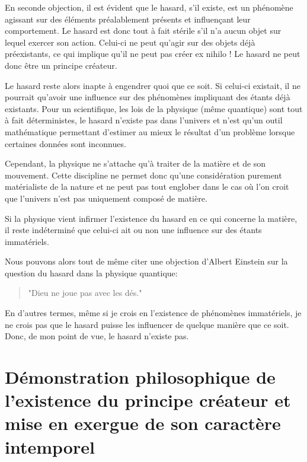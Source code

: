 En seconde objection, il est évident que le hasard, s’il existe, est un phénomène agissant sur des éléments préalablement présents et influençant leur comportement. Le hasard est donc tout à fait stérile s’il n’a aucun objet sur lequel exercer son action. Celui-ci ne peut qu’agir sur des objets déjà préexistants, ce qui implique qu’il ne peut pas créer ex nihilo ! Le hasard ne peut donc être un principe créateur.

Le hasard reste alors inapte à engendrer quoi que ce soit. Si celui-ci existait, il ne pourrait qu'avoir une influence sur des phénomènes impliquant des étants déjà existants. Pour un scientifique, les lois de la physique (même quantique) sont tout à fait déterministes, le hasard n'existe pas dans l'univers et n'est qu'un outil mathématique permettant d'estimer au mieux le résultat d'un problème lorsque certaines données sont inconnues.

Cependant, la physique ne s'attache qu'à traiter de la matière et de son mouvement. Cette discipline ne permet donc qu'une considération purement matérialiste de la nature et ne peut pas tout englober dans le cas où l'on croit que l'univers n'est pas uniquement composé de matière.

Si la physique vient infirmer l'existence du hasard en ce qui concerne la matière, il reste indéterminé que celui-ci ait ou non une influence sur des étants immatériels.

Nous pouvons alors tout de même citer une objection d'Albert Einstein sur la question du hasard dans la physique quantique:

\begin{quote}
"Dieu ne joue pas avec les dés."
\end{quote}

En d'autres termes, même si je crois en l'existence de phénomènes immatériels, je ne crois pas que le hasard puisse les influencer de quelque manière que ce soit. Donc, de mon point de vue, le hasard n'existe pas.

\chapter{Démonstration philosophique de l’existence du principe créateur et mise en exergue de son caractère intemporel}

